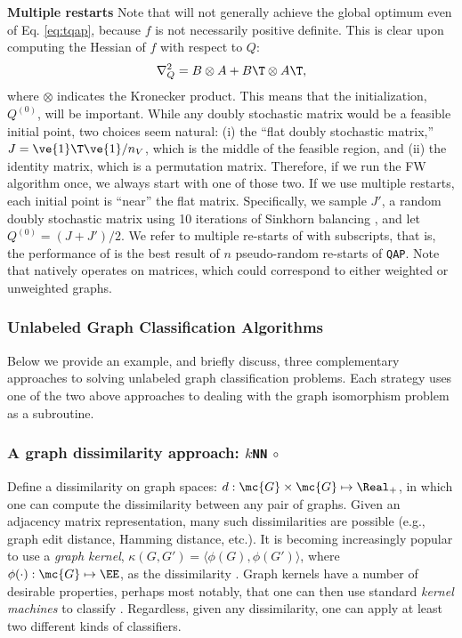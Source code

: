 \documentclass[10pt,journal,cspaper,compsoc]{IEEEtran}
\begin{document}

\textbf{Multiple restarts} Note that \qap will not generally achieve the global optimum even of Eq. \eqref{eq:tqap}, because $f$ is not necessarily positive definite.  This is clear upon computing the Hessian of $f$  with respect to $Q$:
\begin{align}
	\nabla_Q^2  =  B \otimes A + B\T \otimes A\T,
\end{align}
where $\otimes$ indicates the Kronecker product. This means that the initialization, $Q^{(0)}$, will be important.  While any doubly stochastic matrix would be a feasible initial point, two choices seem natural: (i) the ``flat doubly  stochastic matrix,'' $J=\ve{1}\T \ve{1}/n_V$, which is the middle of the feasible region, and (ii) the identity matrix, which is a permutation matrix.  Therefore, if we run the FW algorithm once, we always start with one of those two.  If we use multiple restarts, each initial point is ``near'' the flat matrix.  Specifically, we sample $J'$, a random doubly stochastic matrix using 10 iterations of Sinkhorn balancing \cite{Sinkhorn1964}, and let $Q^{(0)}=(J+J')/2$.  We refer to multiple re-starts of \qap with subscripts, that is, the performance of \qapn is the best result of $n$ pseudo-random re-starts of \texttt{QAP}.  Note that \qap natively operates on matrices, which could correspond to either weighted or unweighted graphs.



\subsubsection{Unlabeled Graph Classification Algorithms} %
\label{sec:algorithms}

Below we provide an example, and briefly discuss, three complementary approaches to solving unlabeled graph classification problems.  Each strategy uses one of the two above approaches to dealing with the graph isomorphism problem as a subroutine.

\subsubsection{A graph dissimilarity approach: \texttt{$k$NN} $\circ$ \qap} %
\label{ssub:_k_nn_circ_qap}

Define a dissimilarity on graph spaces: $d: \mc{G} \times \mc{G} \mapsto \Real_+$, in which one can compute the dissimilarity between any pair of graphs. Given an adjacency matrix representation, many such dissimilarities are possible (e.g., graph edit distance, Hamming distance, etc.).  It is becoming increasingly popular to use a \emph{graph kernel}, $\kappa(G,G')=\langle \phi(G), \phi(G') \rangle$, where $\phi(\cdot): \mc{G} \mapsto \EE$, as the dissimilarity \cite{Bunke2011}.  Graph kernels have a number of desirable properties, perhaps most notably, that one can then use standard \emph{kernel machines} to classify \cite{Vapnik1998}.	Regardless, given any dissimilarity, one can apply at least two different kinds of classifiers.
\end{document}
